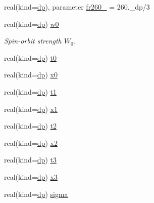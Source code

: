 \begin{DoxyCompactItemize}
\item 
real(kind=\mbox{\hyperlink{namespaceparameters_a52f8c6351fd79345d8811e065bcbbb37}{dp}}), parameter \mbox{\hyperlink{group__FRACTIONS_ga5a9e77cd58019aeeb71cd5be86faf68f}{fr260\+\_}} = 260.\+\_\+dp/3
\item 
real(kind=\mbox{\hyperlink{namespaceparameters_a52f8c6351fd79345d8811e065bcbbb37}{dp}}) \mbox{\hyperlink{group__SKYRME__PARS_gabbfefb4415d1278f79fd07d05105335a}{w0}}
\begin{DoxyCompactList}\small\item\em Spin-\/orbit strength $W_0$. \end{DoxyCompactList}\item 
real(kind=\mbox{\hyperlink{namespaceparameters_a52f8c6351fd79345d8811e065bcbbb37}{dp}}) \mbox{\hyperlink{group__SKYRME__PARS_gadbebfa135603ae9f34b4a98ac62ce8d8}{t0}}
\item 
real(kind=\mbox{\hyperlink{namespaceparameters_a52f8c6351fd79345d8811e065bcbbb37}{dp}}) \mbox{\hyperlink{group__SKYRME__PARS_ga86c5690b49e0b02be9cae32459f6cc37}{x0}}
\item 
real(kind=\mbox{\hyperlink{namespaceparameters_a52f8c6351fd79345d8811e065bcbbb37}{dp}}) \mbox{\hyperlink{group__SKYRME__PARS_ga2104f8e3f4c55a866272683975f6acd0}{t1}}
\item 
real(kind=\mbox{\hyperlink{namespaceparameters_a52f8c6351fd79345d8811e065bcbbb37}{dp}}) \mbox{\hyperlink{group__SKYRME__PARS_ga17d86815551fd59fbeaba6cc8e54438b}{x1}}
\item 
real(kind=\mbox{\hyperlink{namespaceparameters_a52f8c6351fd79345d8811e065bcbbb37}{dp}}) \mbox{\hyperlink{group__SKYRME__PARS_ga28e545481d284c866487bfb61e918159}{t2}}
\item 
real(kind=\mbox{\hyperlink{namespaceparameters_a52f8c6351fd79345d8811e065bcbbb37}{dp}}) \mbox{\hyperlink{group__SKYRME__PARS_ga505cd8d8fea1c311291e29cfb0516c91}{x2}}
\item 
real(kind=\mbox{\hyperlink{namespaceparameters_a52f8c6351fd79345d8811e065bcbbb37}{dp}}) \mbox{\hyperlink{group__SKYRME__PARS_ga41ad159facccbc41a3a4bf58942da03d}{t3}}
\item 
real(kind=\mbox{\hyperlink{namespaceparameters_a52f8c6351fd79345d8811e065bcbbb37}{dp}}) \mbox{\hyperlink{group__SKYRME__PARS_ga361bcdef664c7f70557bcc2f42b2abce}{x3}}
\item 
real(kind=\mbox{\hyperlink{namespaceparameters_a52f8c6351fd79345d8811e065bcbbb37}{dp}}) \mbox{\hyperlink{group__SKYRME__PARS_ga3726a27918a1e2929cdac9ffd451ec14}{sigma}}
\item 

\end{DoxyCompactItemize}
